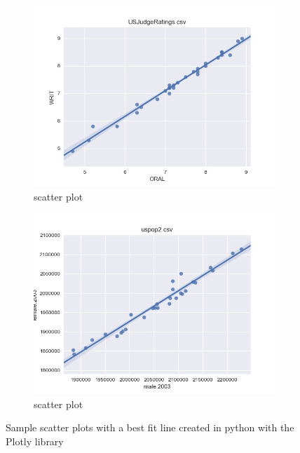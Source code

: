 \documentclass[12pt, a4paper,oneside]{report}
\begin{document}
\begin{figure}[!htb]
	\begin{subfigure}{.6\textwidth}
		\centering
		\includegraphics[width=.8\linewidth]{mis3.jpg}
		\caption{scatter plot}
		\label{fig:mis1}
	\end{subfigure}%
	\begin{subfigure}{.5\textwidth}
		\centering
		\includegraphics[width=1.0\linewidth]{mis2.jpg}
		\caption{scatter plot}
		\label{fig:mis2}
	\end{subfigure}
	\caption{Sample scatter plots with a best fit line created in python with the Plotly library}
	\label{fig:miss}
\end{figure}
\end{document}
